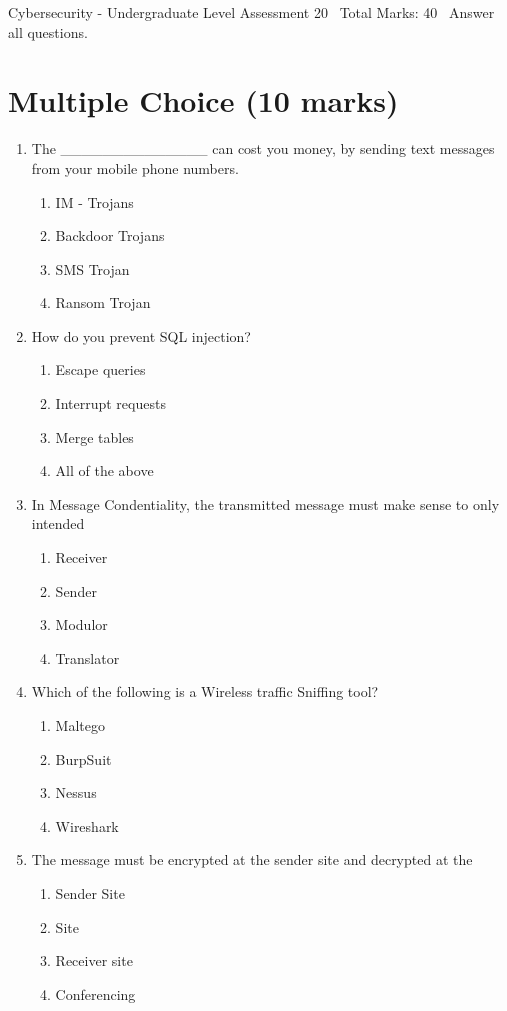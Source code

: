 \documentclass[12pt]{article}
\begin{document}
\begin{center}
Cybersecurity - Undergraduate Level Assessment 20 \
Total Marks: 40 \
Answer all questions.
\end{center}

\section*{Multiple Choice (10 marks)}
\begin{enumerate}[label=\arabic*.]
\item The \_\_\_\_\_\_\_\_\_\_\_\_\_\_ can cost you money, by sending text messages from your mobile phone numbers.
\begin{enumerate}[label=(\alph*)]
    \item IM - Trojans
    \item Backdoor Trojans
    \item SMS Trojan
    \item Ransom Trojan
\end{enumerate}
\item How do you prevent SQL injection?
\begin{enumerate}[label=(\alph*)]
    \item Escape queries
    \item Interrupt requests
    \item Merge tables
    \item All of the above
\end{enumerate}
\item In Message Condentiality, the transmitted message must make sense to only intended
\begin{enumerate}[label=(\alph*)]
    \item Receiver
    \item Sender
    \item Modulor
    \item Translator
\end{enumerate}
\item Which of the following is a Wireless traffic Sniffing tool?
\begin{enumerate}[label=(\alph*)]
    \item Maltego
    \item BurpSuit
    \item Nessus
    \item Wireshark
\end{enumerate}
\item The message must be encrypted at the sender site and decrypted at the
\begin{enumerate}[label=(\alph*)]
    \item Sender Site
    \item Site
    \item Receiver site
    \item Conferencing
\end{enumerate}
\end{enumerate}
\end{document}
